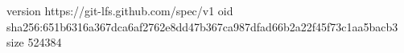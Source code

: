 version https://git-lfs.github.com/spec/v1
oid sha256:651b6316a367dca6af2762e8dd47b367ca987dfad66b2a22f45f73c1aa5bacb3
size 524384
